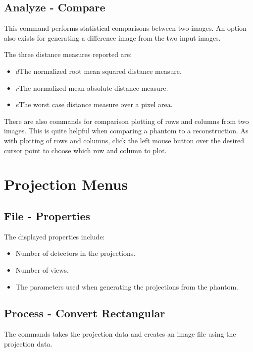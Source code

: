 \subsection{Analyze - Compare}\label{IDH_DLG_COMPARISON}
This command performs statistical comparisons between two images. An option
also exists for generating a difference image from the two input images.

The three distance measures reported are:
\begin{itemize}\itemsep=0pt
\item[] \textbf{$d$}\quad The normalized root mean squared distance measure.
\item[] \textbf{$r$}\quad The normalized mean absolute distance measure.
\item[] \textbf{$e$}\quad The worst case distance measure over a  pixel area.
\end{itemize}

There are also commands for comparison plotting of rows and columns from two images.
This is quite helpful when comparing a phantom to a reconstruction. As with plotting
of rows and columns, click the left mouse button over the desired cursor point to
choose which row and column to plot.


\section{Projection Menus}

\subsection{File - Properties}
The displayed properties include:

\begin{itemize}\itemsep=0pt
\item Number of detectors in the projections.
\item Number of views.
\item The parameters used when generating the projections from the phantom.
\end{itemize}

\subsection{Process - Convert Rectangular}
The commands takes the projection data and creates an image file using
the projection data.

